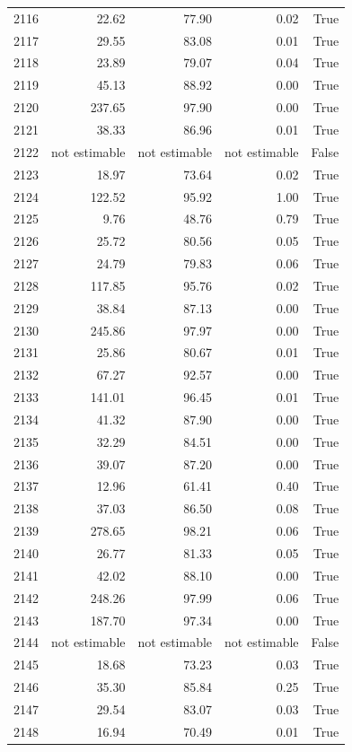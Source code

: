 \begin{longtable}{rrrrr}
2116 & 22.62 & 77.90 & 0.02 & True \\
2117 & 29.55 & 83.08 & 0.01 & True \\
2118 & 23.89 & 79.07 & 0.04 & True \\
2119 & 45.13 & 88.92 & 0.00 & True \\
2120 & 237.65 & 97.90 & 0.00 & True \\
2121 & 38.33 & 86.96 & 0.01 & True \\
2122 & not estimable & not estimable & not estimable & False \\
2123 & 18.97 & 73.64 & 0.02 & True \\
2124 & 122.52 & 95.92 & 1.00 & True \\
2125 & 9.76 & 48.76 & 0.79 & True \\
2126 & 25.72 & 80.56 & 0.05 & True \\
2127 & 24.79 & 79.83 & 0.06 & True \\
2128 & 117.85 & 95.76 & 0.02 & True \\
2129 & 38.84 & 87.13 & 0.00 & True \\
2130 & 245.86 & 97.97 & 0.00 & True \\
2131 & 25.86 & 80.67 & 0.01 & True \\
2132 & 67.27 & 92.57 & 0.00 & True \\
2133 & 141.01 & 96.45 & 0.01 & True \\
2134 & 41.32 & 87.90 & 0.00 & True \\
2135 & 32.29 & 84.51 & 0.00 & True \\
2136 & 39.07 & 87.20 & 0.00 & True \\
2137 & 12.96 & 61.41 & 0.40 & True \\
2138 & 37.03 & 86.50 & 0.08 & True \\
2139 & 278.65 & 98.21 & 0.06 & True \\
2140 & 26.77 & 81.33 & 0.05 & True \\
2141 & 42.02 & 88.10 & 0.00 & True \\
2142 & 248.26 & 97.99 & 0.06 & True \\
2143 & 187.70 & 97.34 & 0.00 & True \\
2144 & not estimable & not estimable & not estimable & False \\
2145 & 18.68 & 73.23 & 0.03 & True \\
2146 & 35.30 & 85.84 & 0.25 & True \\
2147 & 29.54 & 83.07 & 0.03 & True \\
2148 & 16.94 & 70.49 & 0.01 & True \\

\end{longtable}
